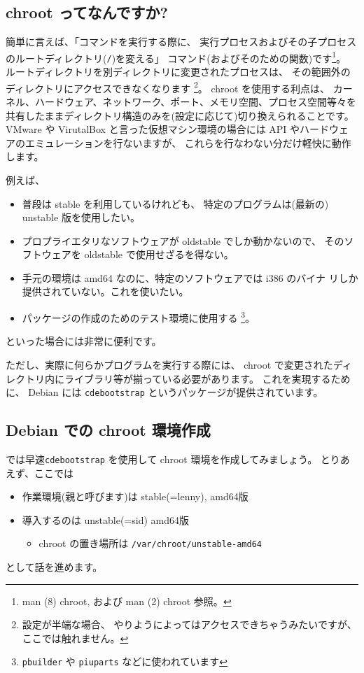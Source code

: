 \documentclass[mingoth,a4paper]{jsarticle}
\begin{document}
\subsection{chroot ってなんですか?}

簡単に言えば、「コマンドを実行する際に、
実行プロセスおよびその子プロセスのルートディレクトリ({\tt /})を変える」
コマンド(およびそのための関数)です\footnote{%
man (8) chroot, および man (2) chroot 参照。}。
%
ルートディレクトリを別ディレクトリに変更されたプロセスは、
その範囲外のディレクトリにアクセスできなくなります%
\footnote{設定が半端な場合、
やりようによってはアクセスできちゃうみたいですが、%
ここでは触れません。}。
%
chroot を使用する利点は、
カーネル、ハードウェア、ネットワーク、ポート、メモリ空間、プロセス空間等々を
共有したままディレクトリ構造のみを(設定に応じて)切り換えられることです。
VMware や VirutalBox と言った仮想マシン環境の場合には
API やハードウェアのエミュレーションを行ないますが、
これらを行なわない分だけ軽快に動作します。

例えば、
\begin{itemize}
    \item 普段は stable を利用しているけれども、
          特定のプログラムは(最新の) unstable 版を使用したい。
    \item プロプライエタリなソフトウェアが oldstable でしか動かないので、
          そのソフトウェアを oldstable で使用せざるを得ない。
    \item 手元の環境は amd64 なのに、特定のソフトウェアでは i386 のバイナ
          リしか提供されていない。これを使いたい。
    \item パッケージの作成のためのテスト環境に使用する%
          \footnote{{\tt pbuilder} や {\tt piuparts} などに使われています}。
\end{itemize}
といった場合には非常に便利です。

ただし、実際に何らかプログラムを実行する際には、
chroot で変更されたディレクトリ内にライブラリ等が揃っている必要があります。
これを実現するために、
Debian には {\tt cdebootstrap} というパッケージが提供されています。

\subsection{Debian での chroot 環境作成}

では早速{\tt cdebootstrap} を使用して chroot 環境を作成してみましょう。
とりあえず、ここでは
\begin{itemize}
    \item 作業環境(親と呼びます)は stable(=lenny), amd64版
    \item 導入するのは unstable(=sid) amd64版
          \begin{itemize}
              \item chroot の置き場所は {\tt /var/chroot/unstable-amd64}
          \end{itemize}
\end{itemize}
として話を進めます。
\end{document}
